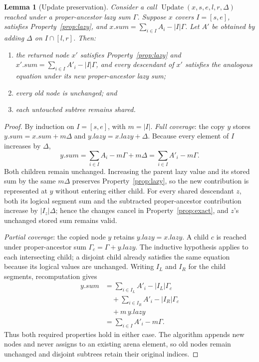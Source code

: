 \documentclass[conference]{IEEEtran}
\newtheorem{lemma}{Lemma}
\begin{document}
\begin{lemma}[Update preservation]
\label{lem:update}
Consider a call $\operatorname{Update}(x,s,e,l,r,\Delta)$ reached under a proper-ancestor lazy sum
$\Gamma$. Suppose $x$ covers $I=[s,e]$, satisfies Property~\ref{prop:lazy}, and
$x.\textit{sum}=\sum_{i\in I}A_i-|I|\Gamma$. Let $A'$ be obtained by adding $\Delta$ on
$I\cap[l,r]$. Then:
\begin{enumerate}
  \item the returned node $x'$ satisfies Property~\ref{prop:lazy} and
        $x'.\textit{sum}=\sum_{i\in I}A'_i-|I|\Gamma$, and every descendant of $x'$ satisfies
        the analogous equation under its new proper-ancestor lazy sum;
  \item every old node is unchanged; and
  \item each untouched subtree remains shared.
\end{enumerate}
\end{lemma}

\begin{proof}
By induction on $I=[s,e]$, with $m=|I|$. \emph{Full coverage}: the copy $y$ stores
$y.\textit{sum}=x.\textit{sum}+m\Delta$ and
$y.\textit{lazy}=x.\textit{lazy}+\Delta$. Because every element of $I$ increases by $\Delta$,
\[
y.\textit{sum}
=\sum_{i\in I}A_i-m\Gamma+m\Delta
=\sum_{i\in I}A'_i-m\Gamma.
\]
Both children remain unchanged. Increasing the parent lazy value and its stored sum by the same
$m\Delta$ preserves Property~\ref{prop:lazy}, so the new contribution is represented at $y$
without entering either child. For every shared descendant $z$, both its logical segment sum and
the subtracted proper-ancestor contribution increase by $|I_z|\Delta$; hence the changes cancel
in Property~\ref{prop:exact}, and $z$'s unchanged stored sum remains valid.

\emph{Partial coverage}: the copied node $y$ retains
$y.\textit{lazy}=x.\textit{lazy}$. A child $c$ is reached under proper-ancestor sum
$\Gamma_c=\Gamma+y.\textit{lazy}$. The inductive hypothesis applies to each intersecting child;
a disjoint child already satisfies the same equation because its logical values are unchanged.
Writing $I_L$ and $I_R$ for the child segments, recomputation gives
\begin{align*}
y.\textit{sum}
&=\sum_{i\in I_L}A'_i-|I_L|\Gamma_c\\
&\quad+\sum_{i\in I_R}A'_i-|I_R|\Gamma_c\\
&\quad+m\,y.\textit{lazy}\\
&=\sum_{i\in I}A'_i-m\Gamma.
\end{align*}
Thus both required properties hold in either case. The algorithm appends new nodes and never
assigns to an existing arena element, so old nodes remain unchanged and disjoint subtrees retain
their original indices.
\end{proof}
\end{document}
